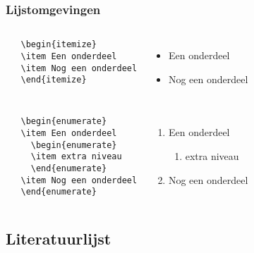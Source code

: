 \documentclass[aspectratio=169]{beamer}
\begin{document}
\begin{frame}[fragile]
 \frametitle{Lijstomgevingen}

 \begin{columns}[c]
   \begin{verbatim}
   \begin{itemize}
   \item Een onderdeel
   \item Nog een onderdeel
   \end{itemize}
   \end{verbatim}

   \begin{itemize}
     \item Een onderdeel
     \item Nog een onderdeel
   \end{itemize}
 \end{columns}

 \pause{}

 \begin{columns}[c]
   \begin{verbatim}
   \begin{enumerate}
   \item Een onderdeel
     \begin{enumerate}
     \item extra niveau
     \end{enumerate}
   \item Nog een onderdeel
   \end{enumerate}
   \end{verbatim}

   \begin{enumerate}
     \item Een onderdeel
     \begin{enumerate}
       \item extra niveau
     \end{enumerate}
     \item Nog een onderdeel
   \end{enumerate}
 \end{columns}

\end{frame}

\subsection{Literatuurlijst}
\end{document}
